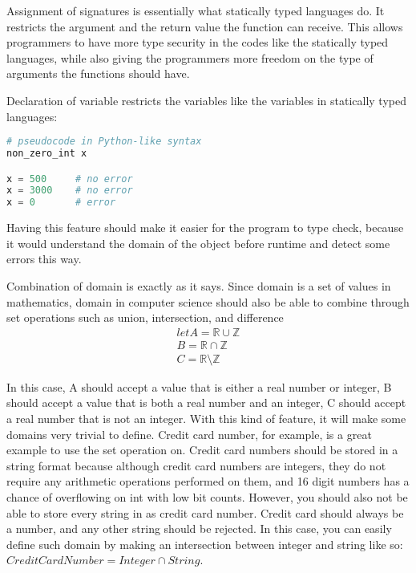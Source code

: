 Assignment of signatures is essentially what statically typed languages do.  It restricts the argument and the return value the function can receive.  This allows programmers to have more type security in the codes like the statically typed languages, while also giving the programmers more freedom on the type of arguments the functions should have.

Declaration of variable restricts the variables like the variables in statically typed languages:

\begin{lstlisting}[language=Python, caption={Domain pseudocode}]
# pseudocode in Python-like syntax
non_zero_int x

x = 500		# no error
x = 3000	# no error
x = 0		# error
\end{lstlisting}

Having this feature should make it easier for the program to type check, because it would understand the domain of the object before runtime and detect some errors this way.

Combination of domain is exactly as it says.  Since domain is a set of values in mathematics, domain in computer science should also be able to combine through set operations such as union, intersection, and difference
\begin{equation}
\begin{aligned}
let A = \mathbb{R} \cup \mathbb{Z}\\
B = \mathbb{R} \cap \mathbb{Z}\\
C = \mathbb{R} \setminus \mathbb{Z}
\end{aligned}
\end{equation}

In this case, A should accept a value that is either a real number or integer, B should accept a value that is both a real number and an integer, C should accept a real number that is not an integer.  With this kind of feature, it will make some domains very trivial to define.  Credit card number, for example, is a great example to use the set operation on.  Credit card numbers should be stored in a string format because although credit card numbers are integers, they do not require any arithmetic operations performed on them, and 16 digit numbers has a chance of overflowing on int with low bit counts.  However, you should also not be able to store every string in as credit card number.  Credit card should always be a number, and any other string should be rejected.  In this case, you can easily define such domain by making an intersection between integer and string like so: $CreditCardNumber = Integer \cap String$.

